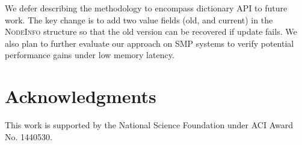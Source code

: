 \documentclass{sig-alternate-05-2015}
\begin{document}
We defer describing the methodology to encompass dictionary API to future work.
The key change is to add two value fields (old, and current) in the \textsc{NodeInfo} structure so that the old version can be recovered if update fails.
We also plan to further evaluate our approach on SMP systems to verify potential performance gains under low memory latency.


\section{Acknowledgments}
This work is supported by the National Science Foundation under ACI Award No. 1440530.



\end{document}
